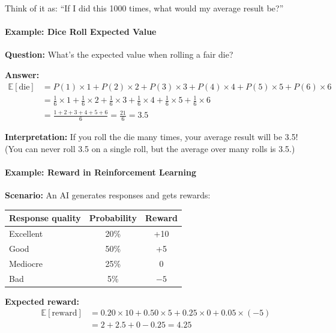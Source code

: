 \begin{chapterenv}
Think of it as: ``If I did this 1000 times, what would my average result be?''

\paragraph{Example: Dice Roll Expected Value}

\textbf{Question:} What's the expected value when rolling a fair die?

\textbf{Answer:}
\begin{align*}
\mathbb{E}[\text{die}] &= P(1) \times 1 + P(2) \times 2 + P(3) \times 3 + P(4) \times 4 + P(5) \times 5 + P(6) \times 6 \\
&= \frac{1}{6} \times 1 + \frac{1}{6} \times 2 + \frac{1}{6} \times 3 + \frac{1}{6} \times 4 + \frac{1}{6} \times 5 + \frac{1}{6} \times 6 \\
&= \frac{1 + 2 + 3 + 4 + 5 + 6}{6} = \frac{21}{6} = 3.5
\end{align*}

\textbf{Interpretation:} If you roll the die many times, your average result will be 3.5! (You can never roll 3.5 on a single roll, but the average over many rolls is 3.5.)

\paragraph{Example: Reward in Reinforcement Learning}

\textbf{Scenario:} An AI generates responses and gets rewards:

\begin{center}
\begin{tabular}{lcc}
\toprule
\textbf{Response quality} & \textbf{Probability} & \textbf{Reward} \\
\midrule
Excellent & 20\% & +10 \\
Good & 50\% & +5 \\
Mediocre & 25\% & 0 \\
Bad & 5\% & $-5$ \\
\bottomrule
\end{tabular}
\end{center}

\textbf{Expected reward:}
\begin{align*}
\mathbb{E}[\text{reward}] &= 0.20 \times 10 + 0.50 \times 5 + 0.25 \times 0 + 0.05 \times (-5) \\
&= 2 + 2.5 + 0 - 0.25 = 4.25
\end{align*}


\end{chapterenv}
